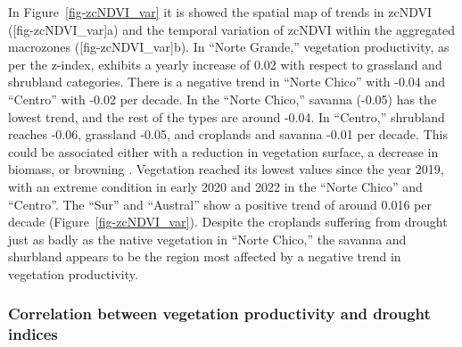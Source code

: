 \documentclass[
  authoryear,
  preprint,
  3p,
  onecolumn]{elsarticle}
\begin{document}
In Figure~\ref{fig-zcNDVI_var} it is showed the spatial map of trends in
zcNDVI ({[}fig-zcNDVI\_var{]}a) and the temporal variation of zcNDVI
within the aggregated macrozones ({[}fig-zcNDVI\_var{]}b). In ``Norte
Grande,'' vegetation productivity, as per the z-index, exhibits a yearly
increase of 0.02 with respect to grassland and shrubland categories.
There is a negative trend in ``Norte Chico'' with -0.04 and ``Centro''
with -0.02 per decade. In the ``Norte Chico,'' savanna (-0.05) has the
lowest trend, and the rest of the types are around -0.04. In ``Centro,''
shrubland reaches -0.06, grassland -0.05, and croplands and savanna
-0.01 per decade. This could be associated either with a reduction in
vegetation surface, a decrease in biomass, or browning
\citep{Miranda2023}. Vegetation reached its lowest values since the year
2019, with an extreme condition in early 2020 and 2022 in the ``Norte
Chico'' and ``Centro''. The ``Sur'' and ``Austral'' show a positive
trend of around 0.016 per decade (Figure~\ref{fig-zcNDVI_var}). Despite
the croplands suffering from drought just as badly as the native
vegetation in ``Norte Chico,'' the savanna and shurbland appears to be
the region most affected by a negative trend in vegetation productivity.

\hypertarget{correlation-between-vegetation-productivity-and-drought-indices}{%
\subsubsection{Correlation between vegetation productivity and drought
indices}\label{correlation-between-vegetation-productivity-and-drought-indices}}
\end{document}
